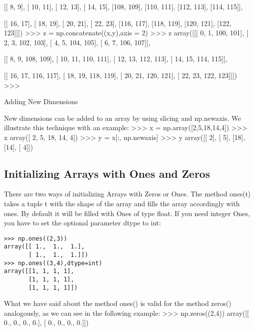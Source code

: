        [[  8,   9],
        [ 10,  11],
        [ 12,  13],
        [ 14,  15],
        [108, 109],
        [110, 111],
        [112, 113],
        [114, 115]],

       [[ 16,  17],
        [ 18,  19],
        [ 20,  21],
        [ 22,  23],
        [116, 117],
        [118, 119],
        [120, 121],
        [122, 123]]])
>>> z = np.concatenate((x,y),axis = 2)
>>> z
array([[[  0,   1, 100, 101],
        [  2,   3, 102, 103],
        [  4,   5, 104, 105],
        [  6,   7, 106, 107]],

       [[  8,   9, 108, 109],
        [ 10,  11, 110, 111],
        [ 12,  13, 112, 113],
        [ 14,  15, 114, 115]],

       [[ 16,  17, 116, 117],
        [ 18,  19, 118, 119],
        [ 20,  21, 120, 121],
        [ 22,  23, 122, 123]]])
>>> 

Adding New Dimensions

New dimensions can be added to an array by using slicing and np.newaxis. We illustrate this technique with an example:
>>> x = np.array([2,5,18,14,4])
>>> x
array([ 2,  5, 18, 14,  4])
>>> y = x[:, np.newaxis]
>>> y
array([[ 2],
       [ 5],
       [18],
       [14],
       [ 4]])

\subsection{Initializing Arrays with Ones and Zeros}

There are two ways of initializing Arrays with Zeros or Ones. The method ones(t) takes a tuple t with the shape of the array and fills the array accordingly with ones. By default it will be filled with Ones of type float. If you need integer Ones, you have to set the optional parameter dtype to int:
\begin{framed}
\begin{verbatim}
>>> np.ones((2,3))
array([[ 1.,  1.,  1.],
       [ 1.,  1.,  1.]])
>>> np.ones((3,4),dtype=int)
array([[1, 1, 1, 1],
       [1, 1, 1, 1],
       [1, 1, 1, 1]])
\end{verbatim}
\end{framed}
What we have said about the method ones() is valid for the method zeros() analogously, as we can see in the following example:
>>> np.zeros((2,4))
array([[ 0.,  0.,  0.,  0.],
       [ 0.,  0.,  0.,  0.]])

